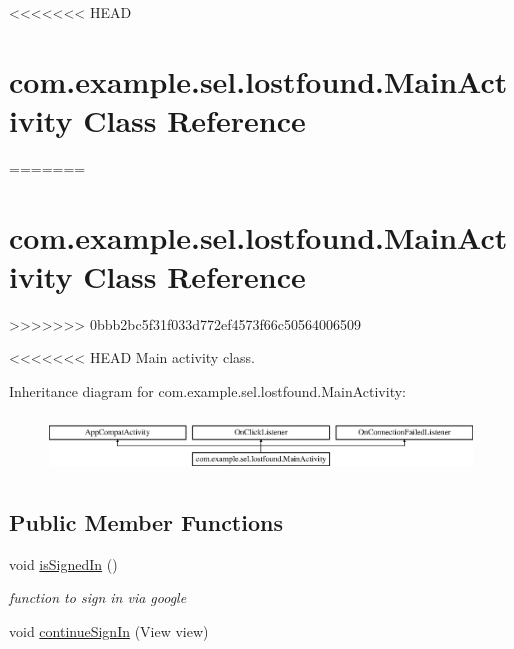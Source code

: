 <<<<<<< HEAD
\hypertarget{classcom_1_1example_1_1sel_1_1lostfound_1_1MainActivity}{\section{com.\-example.\-sel.\-lostfound.\-Main\-Activity Class Reference}
=======
\hypertarget{classcom_1_1example_1_1sel_1_1lostfound_1_1MainActivity}{\section{com.\-example.\-sel.\-lostfound.\-Main\-Activity \-Class \-Reference}
>>>>>>> 0bbb2bc5f31f033d772ef4573f66c50564006509
\label{classcom_1_1example_1_1sel_1_1lostfound_1_1MainActivity}
}


<<<<<<< HEAD
Main activity class.  


Inheritance diagram for com.\-example.\-sel.\-lostfound.\-Main\-Activity\-:\begin{figure}[H]
\begin{center}
\leavevmode
\includegraphics[height=1.542700cm]{classcom_1_1example_1_1sel_1_1lostfound_1_1MainActivity}
\end{center}
\end{figure}
\subsection*{Public Member Functions}
\begin{DoxyCompactItemize}
\item 
\hypertarget{classcom_1_1example_1_1sel_1_1lostfound_1_1MainActivity_a55b436bf176e21d22abf837dc8f2602c}{void \hyperlink{classcom_1_1example_1_1sel_1_1lostfound_1_1MainActivity_a55b436bf176e21d22abf837dc8f2602c}{is\-Signed\-In} ()}\label{classcom_1_1example_1_1sel_1_1lostfound_1_1MainActivity_a55b436bf176e21d22abf837dc8f2602c}

\begin{DoxyCompactList}\small\item\em function to sign in via google \end{DoxyCompactList}\item 
\hypertarget{classcom_1_1example_1_1sel_1_1lostfound_1_1MainActivity_af6914b0175f989ccb1c616f05a162f1a}{void \hyperlink{classcom_1_1example_1_1sel_1_1lostfound_1_1MainActivity_af6914b0175f989ccb1c616f05a162f1a}{continue\-Sign\-In} (View view)}\label{classcom_1_1example_1_1sel_1_1lostfound_1_1MainActivity_af6914b0175f989ccb1c616f05a162f1a}


\end{DoxyCompactItemize}}
